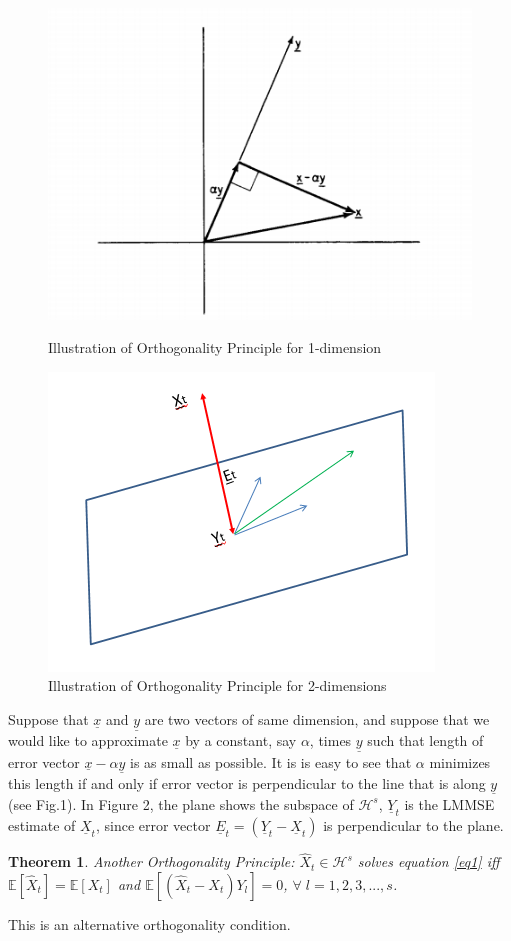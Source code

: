 \documentclass[a4paper,english,12pt]{article}
\newtheorem{theorem}{Theorem}[section]
\begin{document}
\begin{figure}
\centering
\includegraphics[scale=1]{Figures/Lec24_fig1.png}
\caption{Illustration of Orthogonality Principle for 1-dimension}
\includegraphics[scale=1]{Figures/Lec24_fig2.png}
\caption{Illustration of Orthogonality Principle for 2-dimensions}
\end{figure}
\pagebreak
Suppose that $\underline{x}$ and $\underline{y}$ are two vectors of same dimension, and suppose that we would like to approximate $\underline{x}$ by a constant, say $\alpha$, times $\underline{y}$ such that length of error vector $\underline{x}-\alpha\underline{y}$ is as small as possible. It is is easy to see that $\alpha$ minimizes this length if and only if error vector is perpendicular to the line that is along $\underline{y}$(see Fig.1).
In Figure 2, the plane shows the subspace of $\mathcal{H}^s$, $\underline{Y}_t$ is the LMMSE estimate of $\underline{X}_t$, since error vector $\underline{E}_t=(\underline{Y}_t-\underline{X}_t)$ is perpendicular to the plane. 
\begin{theorem}
Another Orthogonality Principle:
$ \hat{X}_t \in \mathcal{H}^s $ solves equation \eqref{eq1} iff $
 \mathbb{E}[\hat{X}_{t}]=\mathbb{E}[X_{t}]$  and 
 $\mathbb{E}[(\hat{X}_{t}-X_t)Y_l]=0$, $\forall \; l=1,2,3,...,s$.
\end{theorem}
\begin{flushleft}
This is an alternative orthogonality condition. \\
\end{flushleft}
\end{document}
